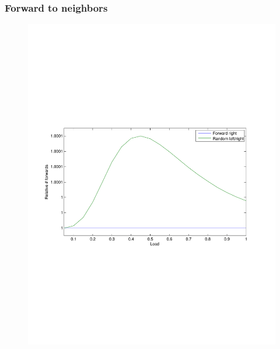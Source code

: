 \documentclass[compress]{beamer}
\begin{document}
\begin{frame}
\frametitle{Forward to neighbors}
\begin{figure}[h!tb]
\includegraphics[width=\textwidth,clip=true,trim=3em 22em 6em 23em]{../resources/validate_rlr.pdf}
\end{figure}
\end{frame}
\end{document}
